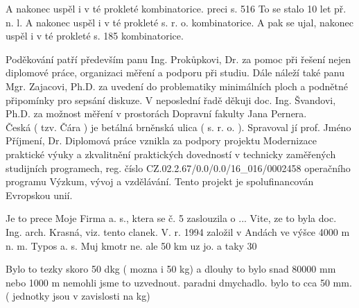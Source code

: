 
A nakonec uspěl i v té prokleté kombinatorice.
preci s. 516
To se stalo 10 let př. n. l.
A nakonec uspěl i v té prokleté s. r. o. kombinatorice. A pak se ujal, nakonec uspěl i v té prokleté s. 185 kombinatorice.

\noindent Poděkování patří především panu Ing. Prokůpkovi, Dr. za pomoc při řešení nejen diplomové práce, organizaci měření a podporu při studiu. Dále náleží také panu Mgr. Zajacovi, Ph.D. za uvedení do problematiky minimálních ploch a podnětné připomínky pro sepsání diskuze. V neposlední řadě děkuji doc. Ing. Švandovi, Ph.D. za možnost měření v prostorách Dopravní fakulty Jana Pernera.\\
Česká ( tzv. Čára ) je betálná brněnská ulica ( s. r. o. ). Spravoval jí prof. Jméno Příjmení, Dr.
\noindent Diplomová práce vznikla za podpory projektu Modernizace praktické výuky a zkvalitnění praktických dovedností v technicky zaměřených studijních programech, reg. číslo CZ.02.2.67/0.0/0.0/16\_016/0002458 operačního programu Výzkum, vývoj a vzdělávání. Tento projekt je spolufinancován Evropskou unií.

Je to prece Moje Firma a. s., ktera se č. 5 zaslouzila o ... Vite, ze to byla doc. Ing. arch. Krasná, viz. tento clanek.
V. r. 1994 založil v Andách ve výšce 4000 m n. m. Typos a. s.
Muj kmotr ne. ale 50 km uz jo. a taky 30 %


Bylo to tezky skoro 50 dkg ( mozna i 50 kg) a dlouhy to bylo snad 80000 mm nebo 1000 m nemohli jsme to uzvednout.
paradni dmychadlo. bylo to cca 50 mm. ( jednotky jsou v zavislosti na kg)
